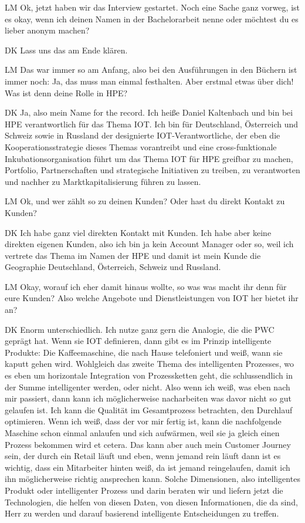 \begin{xlist}
     \item[LM] Ok, jetzt haben wir das Interview gestartet. Noch eine Sache ganz vorweg, ist es okay, wenn ich deinen Namen in der Bachelorarbeit nenne oder möchtest du es lieber anonym machen?
     \item[DK] Lass uns das am Ende klären.
     \item[LM] Das war immer so am Anfang, also bei den Ausführungen in den Büchern ist immer noch: Ja, das muss man einmal festhalten. Aber erstmal etwas über dich! Was ist denn deine Rolle in HPE?
     \item[DK] Ja, also mein Name for the record. Ich heiße Daniel Kaltenbach und bin bei HPE verantwortlich für das Thema IOT. Ich bin für Deutschland, Österreich und Schweiz sowie in Russland der designierte IOT-Verantwortliche, der eben die Kooperationsstrategie dieses Themas vorantreibt und eine cross-funktionale Inkubationsorganisation führt um das Thema IOT für HPE greifbar zu machen, Portfolio, Partnerschaften und strategische Initiativen zu treiben, zu verantworten und nachher zu Marktkapitalisierung führen zu lassen.
     \item[LM] Ok, und wer zählt so zu deinen Kunden? Oder hast du direkt Kontakt zu Kunden?
     \item[DK] Ich habe ganz viel direkten Kontakt mit Kunden. Ich habe aber keine direkten eigenen Kunden, also ich bin ja kein Account Manager oder so, weil ich vertrete das Thema im Namen der HPE und damit ist mein Kunde die Geographie Deutschland, Österreich, Schweiz und Russland.
     \item[LM] Okay, worauf ich eher damit hinaus wollte, so was was macht ihr denn für eure Kunden? Also welche Angebote und Dienstleistungen von IOT her bietet ihr an?
     \item[DK] Enorm unterschiedlich. Ich nutze ganz gern die Analogie, die die PWC geprägt hat. Wenn sie IOT definieren, dann gibt es im Prinzip intelligente Produkte: Die Kaffeemaschine, die nach Hause telefoniert und weiß, wann sie kaputt gehen wird. Wohlgleich das zweite Thema des intelligenten Prozesses, wo es eben um horizontale Integration von Prozessketten geht, die schlussendlich in der Summe intelligenter werden, oder nicht. Also wenn ich weiß, was eben nach mir passiert, dann kann ich möglicherweise nacharbeiten was davor nicht so gut gelaufen ist. Ich kann die Qualität im Gesamtprozess betrachten, den Durchlauf optimieren. Wenn ich weiß, dass der vor mir fertig ist, kann die nachfolgende Maschine schon einmal anlaufen und sich aufwärmen, weil sie ja gleich einen Prozess bekommen wird et cetera. Das kann aber auch mein Customer Journey sein, der durch ein Retail läuft und eben, wenn jemand rein läuft dann ist es wichtig, dass ein Mitarbeiter hinten weiß, da ist jemand reingelaufen, damit ich ihn möglicherweise richtig ansprechen kann. Solche Dimensionen, also intelligentes Produkt oder intelligenter Prozess und darin beraten wir und liefern jetzt die Technologien, die helfen von diesen Daten, von diesen Informationen, die da sind, Herr zu werden und darauf basierend intelligente Entscheidungen zu treffen.

\end{xlist}

